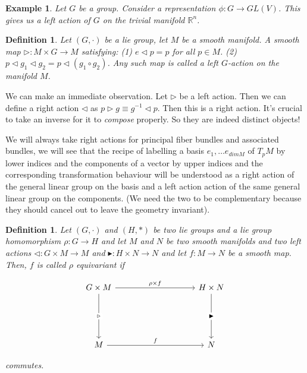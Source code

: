 \documentclass[11pt]{book}
\newtheorem{definition}[theorem]{Definition}
\newtheorem{example}[theorem]{Example}
\begin{document}
\begin{example}
Let $G$ be a group. Consider a representation $\phi: G \rightarrow GL(V)$. This gives us
a left action of $G$ on the trivial manifold $\mathbb R^n$.
\end{example}


\begin{definition}
Let $(G, \cdot)$ be a lie group, let $M$ be a smooth manifold. A smooth map
$\triangleright: M \times G \rightarrow M$ satisfying: (1) $e \triangleleft p = p$ for all $p \in M$.
(2) $p \triangleleft g_1 \triangleleft g_2 =  p \triangleleft (g_1 \circ g_2) $. Any such map is
called a left $G$-action on the manifold $M$.
\end{definition}

We can make an immediate observation. Let $\triangleright$ be a left action. Then we can define
a right action $\triangleleft$ as $p \triangleright g \equiv g^{-1} \triangleleft p$. Then this
is a right action. It's crucial to take an inverse for it to \emph{compose} properly. So they are
indeed distinct objects!


We will always take right actions for principal fiber bundles and associated bundles,
we will see that the recipe of labelling a basis $e_1, \dots e_{dim M}$ of $T_p M$ by lower
indices and the components of a vector by upper indices and the corresponding transformation behaviour
will be understood as a right action of the general linear group on the basis and a left action
action of the same general linear group on the components. (We need the two to be complementary
because they should cancel out to leave the geometry invariant).

\begin{definition}
Let $(G, \cdot)$ and $(H, *)$ be two lie groups and a lie group homomorphism $\rho: G \rightarrow H$
and let $M$ and $N$ be two smooth manifolds and two left actions $\triangleleft: G \times M \rightarrow M$
and $\blacktriangleright: H \times N \rightarrow N$ and let $f: M \rightarrow N$ be a smooth map.
Then, $f$ is called $\rho$ equivariant if 

\[\begin{tikzcd}
	{G \times M} &&&& {H \times N} \\
	\\
	\\
	M &&&& N
	\arrow["{\rho\times f}", from=1-1, to=1-5]
	\arrow["f", from=4-1, to=4-5]
	\arrow["\triangleright"{description}, from=1-1, to=4-1]
	\arrow["\blacktriangleright"{description}, from=1-5, to=4-5]
\end{tikzcd}\]

commutes.
\end{definition}
\end{document}
